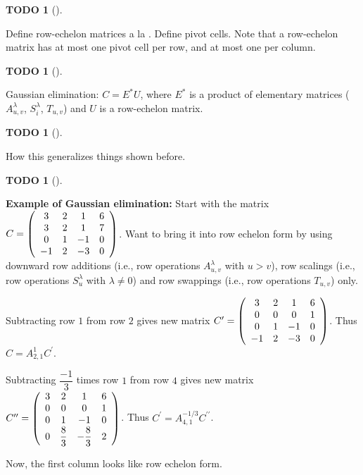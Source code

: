 \documentclass[numbers=enddot,12pt,final,onecolumn,notitlepage]{scrartcl}%
\theoremstyle{definition}
\newtheorem{quest}[theo]{TODO}
\newenvironment{todo}[1][]
{\begin{quest}[#1]\begin{leftbar}}
{\end{leftbar}\end{quest}}
\begin{document}
\begin{todo}
Define row-echelon matrices a la \cite[Definition 2.10.4]{Kowals16}. Define
pivot cells. Note that a row-echelon matrix has at most one pivot cell per
row, and at most one per column.
\end{todo}

\begin{todo}
Gaussian elimination: $C=E^{\ast}U$, where $E^{\ast}$ is a product of
elementary matrices ($A_{u,v}^{\lambda}$, $S_{i}^{\lambda}$, $T_{u,v}$) and
$U$ is a row-echelon matrix.
\end{todo}

\begin{todo}
How this generalizes things shown before.
\end{todo}

\begin{todo}
\textbf{Example of Gaussian elimination:} Start with the matrix $C=\left(
\begin{array}
[c]{cccc}%
3 & 2 & 1 & 6\\
3 & 2 & 1 & 7\\
0 & 1 & -1 & 0\\
-1 & 2 & -3 & 0
\end{array}
\right)  $. Want to bring it into row echelon form by using downward row
additions (i.e., row operations $A_{u,v}^{\lambda}$ with $u>v$), row scalings
(i.e., row operations $S_{u}^{\lambda}$ with $\lambda\neq0$) and row swappings
(i.e., row operations $T_{u,v}$) only.

Subtracting row $1$ from row $2$ gives new matrix $C^{\prime}=\left(
\begin{array}
[c]{cccc}%
3 & 2 & 1 & 6\\
0 & 0 & 0 & 1\\
0 & 1 & -1 & 0\\
-1 & 2 & -3 & 0
\end{array}
\right)  $. Thus $C=A_{2,1}^{1}C^{\prime}$.

Subtracting $\dfrac{-1}{3}$ times row $1$ from row $4$ gives new matrix
$C^{\prime\prime}=\left(
\begin{array}
[c]{cccc}%
3 & 2 & 1 & 6\\
0 & 0 & 0 & 1\\
0 & 1 & -1 & 0\\
0 & \dfrac{8}{3} & -\dfrac{8}{3} & 2
\end{array}
\right)  $. Thus $C^{\prime}=A_{4,1}^{-1/3}C^{\prime\prime}$.

Now, the first column looks like row echelon form.


\end{todo}
\end{document}
